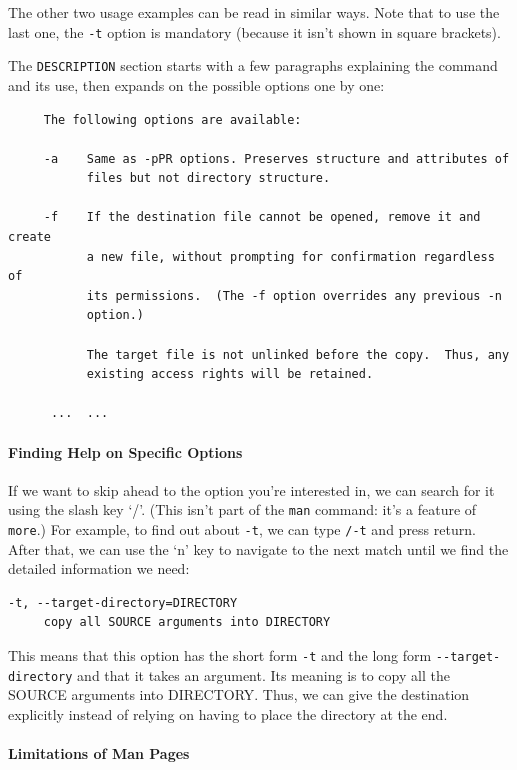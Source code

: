\documentclass[]{book}
\begin{document}
The other two usage examples can be read in similar ways. Note that to
use the last one, the \texttt{-t} option is mandatory (because it isn't
shown in square brackets).

The \texttt{DESCRIPTION} section starts with a few paragraphs explaining
the command and its use, then expands on the possible options one by
one:

\begin{verbatim}
     The following options are available:

     -a    Same as -pPR options. Preserves structure and attributes of
           files but not directory structure.

     -f    If the destination file cannot be opened, remove it and create
           a new file, without prompting for confirmation regardless of
           its permissions.  (The -f option overrides any previous -n
           option.)

           The target file is not unlinked before the copy.  Thus, any
           existing access rights will be retained.

      ...  ...
\end{verbatim}

\mbox{}\paragraph{Finding Help on Specific Options}

If we want to skip ahead to the option you're interested in, we can
search for it using the slash key `/'. (This isn't part of the
\texttt{man} command: it's a feature of \texttt{more}.) For example, to
find out about \texttt{-t}, we can type \texttt{/-t} and press return.
After that, we can use the `n' key to navigate to the next match until
we find the detailed information we need:

\begin{verbatim}
-t, --target-directory=DIRECTORY
     copy all SOURCE arguments into DIRECTORY
\end{verbatim}

This means that this option has the short form \texttt{-t} and the long
form \texttt{-{}-target-directory} and that it takes an argument. Its
meaning is to copy all the SOURCE arguments into DIRECTORY. Thus, we can
give the destination explicitly instead of relying on having to place
the directory at the end.

\mbox{}\paragraph{Limitations of Man Pages}
\end{document}
